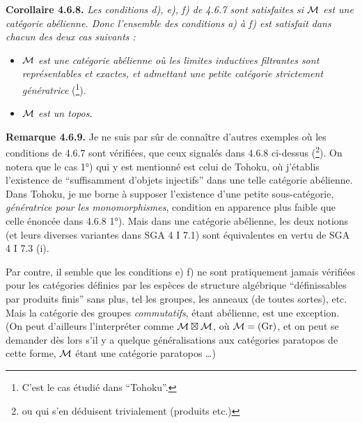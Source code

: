 \textbf{Corollaire 4.6.8.} \textit{Les conditions d), e), f) de 4.6.7 sont satisfaites si $\mathcal{M}$ est une catégorie abélienne. Donc l'ensemble des conditions a) à f) est satisfait dans chacun des deux cas suivants :}
\begin{itemize}[leftmargin=4em]
\item[\textit{1)}] \textit{$\mathcal{M}$ est une catégorie abélienne où les limites inductives filtrantes sont représentables et exactes, et admettant une petite catégorie strictement génératrice} (\footnote[63]{C'est le cas étudié dans “Tohoku”.}).
\item[\textit{2)}] \textit{$\mathcal{M}$ est un topos.}
\end{itemize}
\textbf{Remarque 4.6.9.} Je ne suis par sûr de connaître d'autres exemples où les conditions de 4.6.7 sont vérifiées, que ceux signalés dans 4.6.8 ci-dessus (\footnote[64]{ou qui s'en déduisent trivialement (produits etc.)}). On notera que le cas 1°) qui y est mentionné est celui de Tohoku, où j'établis l'existence de “suffisamment d'objets injectifs” dans une telle catégorie abélienne. Dans Tohoku, je me borne à supposer l'existence d'une petite sous-catégorie, \textit{génératrice pour les monomorphismes}, condition en apparence plus faible que celle énoncée dans 4.6.8 1°). Mais dans une catégorie abélienne, les deux notions (et leurs diverses variantes dans SGA 4 I 7.1) sont équivalentes en vertu de SGA 4 I 7.3 (i). %


Par contre, il semble que les conditions e) f) ne sont pratiquement jamais vérifiées pour les catégories définies par les espèces de structure algébrique “définissables par produits finis” sans plus, tel les groupes, les anneaux (de toutes sortes), etc. Mais la catégorie des groupes \textit{commutatifs}, étant abélienne, est une exception. (On peut d'ailleurs l'interpréter comme $\mathcal{M} \boxtimes \mathcal{M}$, où $\mathcal{M} = (\mathrm{Gr})$, et on peut se demander dès lors s'il y a quelque généralisations aux catégories paratopos de cette forme, $\mathcal{M}$ étant une catégorie paratopos \ldots) %


